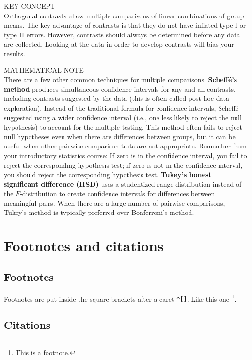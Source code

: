 \documentclass[
]{report}
\theoremstyle{definition}
\theoremstyle{definition}
\theoremstyle{definition}
\theoremstyle{definition}
\theoremstyle{remark}
\begin{document}
KEY CONCEPT\\
Orthogonal contrasts allow multiple comparisons of linear combinations of group means. The key advantage of contrasts is that they do not have inflated type I or type II errors. However, contrasts should always be determined before any data are collected. Looking at the data in order to develop contrasts will bias your results.

MATHEMATICAL NOTE\\
There are a few other common techniques for multiple comparisons. \textbf{Scheffé's method} produces simultaneous confidence intervals for any and all contrasts, including contrasts suggested by the data (this is often called post hoc data exploration). Instead of the traditional formula for confidence intervals, Scheffé suggested using a wider confidence interval (i.e., one less likely to reject the null hypothesis) to account for the multiple testing. This method often fails to reject null hypotheses even when there are differences between groups, but it can be useful when other pairwise comparison tests are not appropriate. Remember from your introductory statistics course: If zero is in the confidence interval, you fail to reject the corresponding hypothesis test; if zero is not in the confidence interval, you should reject the corresponding hypothesis test. \textbf{Tukey's honest significant difference (HSD)} uses a studentized range distribution instead of the \(F\)-distribution to create confidence intervals for differences between meaningful pairs. When there are a large number of pairwise comparisons, Tukey's method is typically preferred over Bonferroni's method.

\hypertarget{footnotes-and-citations}{%
\chapter{Footnotes and citations}\label{footnotes-and-citations}}

\hypertarget{footnotes}{%
\section{Footnotes}\label{footnotes}}

Footnotes are put inside the square brackets after a caret \texttt{\^{}{[}{]}}. Like this one \footnote{This is a footnote.}.

\hypertarget{citations}{%
\section{Citations}\label{citations}}
\end{document}
